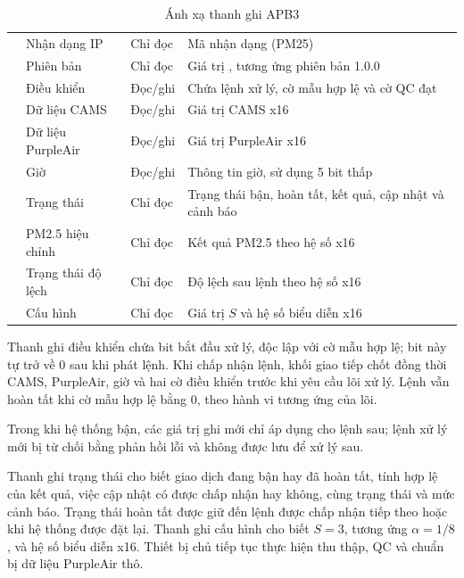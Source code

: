 \documentclass[a4paper,oneside,openany]{extreport}
\begin{document}
\begin{table}[H]
\centering
\caption{Ánh xạ thanh ghi APB3}
\label{tab:apb_register_map}
\begin{tabularx}{\textwidth}{|C{0.13\textwidth}|L{0.27\textwidth}|C{0.17\textwidth}|Y|}
\hline
{} &  &  &  \\
\hline
{} & Nhận dạng IP & Chỉ đọc & Mã nhận dạng  (PM25) \\
\hline
{} & Phiên bản & Chỉ đọc & Giá trị , tương ứng phiên bản 1.0.0 \\
\hline
{} & Điều khiển & Đọc/ghi & Chứa lệnh xử lý, cờ mẫu hợp lệ và cờ QC đạt \\
\hline
{} & Dữ liệu CAMS & Đọc/ghi & Giá trị CAMS x16 \\
\hline
{} & Dữ liệu PurpleAir & Đọc/ghi & Giá trị PurpleAir x16 \\
\hline
{} & Giờ & Đọc/ghi & Thông tin giờ, sử dụng 5 bit thấp \\
\hline
{} & Trạng thái & Chỉ đọc & Trạng thái bận, hoàn tất, kết quả, cập nhật và cảnh báo \\
\hline
{} & PM2.5 hiệu chỉnh & Chỉ đọc & Kết quả PM2.5 theo hệ số x16 \\
\hline
{} & Trạng thái độ lệch & Chỉ đọc & Độ lệch sau lệnh theo hệ số x16 \\
\hline
{} & Cấu hình & Chỉ đọc & Giá trị $S$ và hệ số biểu diễn x16 \\
\hline
\end{tabularx}
\end{table}

Thanh ghi điều khiển chứa bit bắt đầu xử lý, độc lập với cờ mẫu hợp lệ; bit này tự trở về 0 sau khi phát lệnh. Khi chấp nhận lệnh, khối giao tiếp chốt đồng thời CAMS, PurpleAir, giờ và hai cờ điều khiển trước khi yêu cầu lõi xử lý. Lệnh vẫn hoàn tất khi cờ mẫu hợp lệ bằng 0, theo hành vi tương ứng của lõi.

Trong khi hệ thống bận, các giá trị ghi mới chỉ áp dụng cho lệnh sau; lệnh xử lý mới bị từ chối bằng phản hồi lỗi và không được lưu để xử lý sau.

Thanh ghi trạng thái cho biết giao dịch đang bận hay đã hoàn tất, tính hợp lệ của kết quả, việc cập nhật có được chấp nhận hay không, cùng trạng thái và mức cảnh báo. Trạng thái hoàn tất được giữ đến lệnh được chấp nhận tiếp theo hoặc khi hệ thống được đặt lại. Thanh ghi cấu hình cho biết $S=3$, tương ứng $\alpha=1/8$, và hệ số biểu diễn x16. Thiết bị chủ tiếp tục thực hiện thu thập, QC và chuẩn bị dữ liệu PurpleAir thô.
\end{document}
